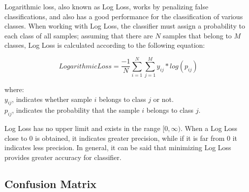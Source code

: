 Logarithmic loss, also known as Log Loss, works by penalizing false classifications, and also has a good performance for the classification of various classes. When working with Log Loss, the classifier must assign a probability to each class of all samples; assuming that there are $N$ samples that belong to $M$ classes, Log Loss is calculated according to the following equation:

\begin{equation}
LogarithmicLoss = \frac{-1}{N}\sum_{i=1}^{N}\sum_{j=1}^{M} y_{ij}*log(p_{ij})
\end{equation}

where:
\\
$y_{ij}$, indicates whether sample $i$ belongs to class $j$ or not.\\
$p_{ij}$, indicates the probability that the sample $i$ belongs to class $j$.

\vspace{5mm} %

Log Loss has no upper limit and exists in the range $[0, \infty )$. When a Log Loss close to 0 is obtained, it indicates greater precision, while if it is far from 0 it indicates less precision. In general, it can be said that minimizing Log Loss provides greater accuracy for classifier.

\subsection{Confusion Matrix}

